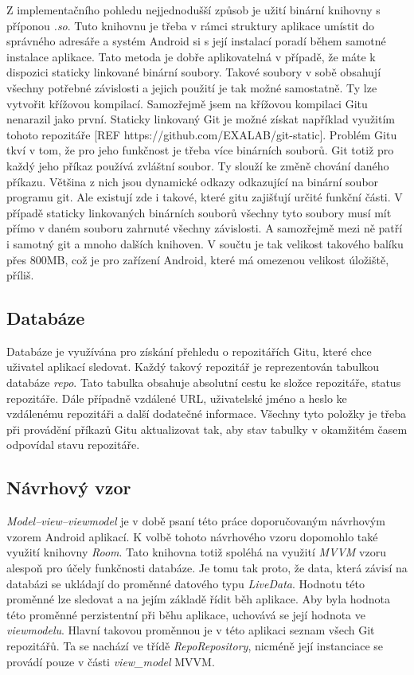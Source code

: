         Z implementačního pohledu nejjednodušší způsob je užití binární knihovny s příponou \emph{.so}. Tuto knihovnu je třeba v rámci struktury aplikace umístit do správného adresáře a systém Android si s její instalací poradí během samotné instalace aplikace. Tato metoda je dobře aplikovatelná v případě, že máte k dispozici staticky linkované binární soubory. Takové soubory v sobě obsahují všechny potřebné závislosti a jejich použití je tak možné samostatně. Ty lze vytvořit křížovou kompilací. Samozřejmě jsem na křížovou kompilaci Gitu nenarazil jako první. Staticky linkovaný Git je možné získat například využitím tohoto repozitáře [REF https://github.com/EXALAB/git-static]. Problém Gitu tkví v tom, že pro jeho funkčnost je třeba více binárních souborů. Git totiž pro každý jeho příkaz používá zvláštní soubor. Ty slouží ke změně chování daného příkazu. Většina z nich jsou dynamické odkazy odkazující na binární soubor programu git. Ale existují zde i takové, které gitu zajišťují určité funkční části. V případě staticky linkovaných binárních souborů všechny tyto soubory musí mít přímo v daném souboru zahrnuté všechny závislosti. A samozřejmě mezi ně patří i samotný git a mnoho dalších knihoven. V součtu je tak velikost takového balíku přes 800MB, což je pro zařízení Android, které má omezenou velikost úložiště, příliš.


        \subsection{Databáze}
        Databáze je využívána pro získání přehledu o repozitářích Gitu, které chce uživatel aplikací sledovat. Každý takový repozitář je reprezentován tabulkou databáze \emph{repo}. Tato tabulka obsahuje absolutní cestu ke složce repozitáře, status repozitáře. Dále případně vzdálené URL, uživatelské jméno a heslo ke vzdálenému repozitáři a další dodatečné informace. Všechny tyto položky je třeba při provádění příkazů Gitu aktualizovat tak, aby stav tabulky v okamžitém časem odpovídal stavu repozitáře.

        \subsection{Návrhový vzor}
        \emph{Model–view–viewmodel} je v době psaní této práce doporučovaným návrhovým vzorem Android aplikací. K volbě tohoto návrhového vzoru dopomohlo také využití knihovny \emph{Room}. Tato knihovna totiž spoléhá na využití \emph{MVVM} vzoru alespoň pro účely funkčnosti databáze. Je tomu tak proto, že data, která závisí na databázi se ukládají do proměnné datového typu \emph{LiveData}. Hodnotu této proměnné lze sledovat a na jejím základě řídit běh aplikace. Aby byla hodnota této proměnné perzistentní při běhu aplikace, uchovává se její hodnota ve \emph{viewmodelu}. Hlavní takovou proměnnou je v této aplikaci seznam všech Git repozitářů. Ta se nachází ve třídě \emph{RepoRepository}, nicméně její instanciace se provádí pouze v části \emph{view\_model} MVVM.

